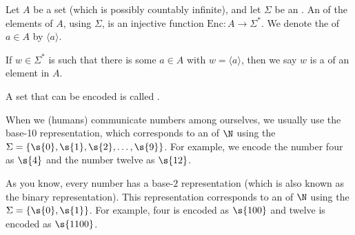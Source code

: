 \begin{flex}
\begin{definition} \label{definition:Encoding-of-a-set}
Let $A$ be a set (which is possibly countably infinite), and let $\Sigma$ be an . 
An  of the elements of $A$, using $\Sigma$, is an injective function $\text{Enc}: A \to \Sigma^*$. 
We denote the  of $a \in A$ by $\langle a \rangle$. 

If $w \in \Sigma^*$ is such that there is some $a \in A$ with $w = \langle a \rangle$, then we say $w$ is a  of an element in $A$. 

A set that can be encoded is called .
\end{definition}

\begin{example} \label{example:Decimal-encoding-of-naturals}
When we (humans) communicate numbers among ourselves, we usually use the base-10 representation, which corresponds to an  of $\N$ using the  $\Sigma = \{\s{0},\s{1},\s{2},\ldots, \s{9}\}$. For example, we encode the number four as $\s{4}$ and the number twelve as $\s{12}$.
\end{example}

\begin{example} \label{example:Binary-encoding-of-naturals}
As you know, every number has a base-$2$ representation (which is also known as the binary representation). This representation corresponds to an  of $\N$ using the  $\Sigma = \{\s{0},\s{1}\}$. For example, four is encoded as $\s{100}$ and twelve is encoded as $\s{1100}$.
\end{example}


\end{flex}

